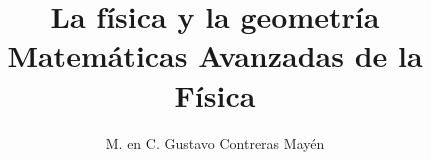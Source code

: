 
\usepackage{standalone}
\usepackage{tikz-3dplot}

\title{La física y la geometría \\[0.3em]  \large{Matemáticas Avanzadas de la Física}\vspace{-3ex}}
\author{M. en C. Gustavo Contreras Mayén}
\date{ }


\vspace{-4cm}
\maketitle
\fontsize{14}{14}\selectfont
\tableofcontents
\newpage





